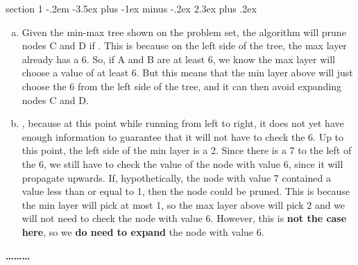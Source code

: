 \documentclass[12pt]{article}
\makeatletter
\newenvironment{problem}{\@startsection
       {section}
       {1}
       {-.2em}
       {-3.5ex plus -1ex minus -.2ex}
       {2.3ex plus .2ex}
       {\pagebreak[3] %
       \large\bf\noindent{Problem }
       }
       }
       {%
       \begin{center}\large\bf \ldots\ldots\ldots\end{center}}
\makeatother
\begin{document}
\begin{problem}{}
\begin{enumerate}[(a)]
\item Given the min-max tree shown on the problem set, the algorithm will prune nodes C and D if . This is because on the left side of the tree, the max layer already has a 6. So, if A and B are at least 6, we know the max layer will choose a value of at least 6. But this means that the min layer above will just choose the 6 from the left side of the tree, and it can then avoid expanding nodes C and D.

\item {}, because at this point while running from left to right, it does not yet have enough information to guarantee that it will not have to check the 6. Up to this point, the left side of the min layer is a 2. Since there is a 7 to the left of the 6, we still have to check the value of the node with value 6, since it will propagate upwards. If, hypothetically, the node with value 7 contained a value less than or equal to 1, then the node could be pruned. This is because the min layer will pick at most 1, so the max layer above will pick 2 and we will not need to check the node with value 6. However, this is \textbf{not the case here}, so we \textbf{do need to expand} the node with value 6.
\end{enumerate}
\end{problem}
\end{document}
